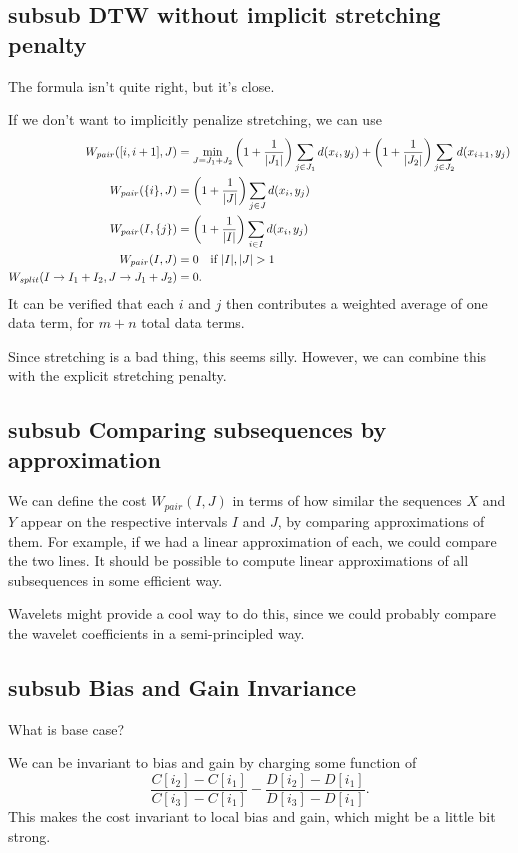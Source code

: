 \subsection{subsub DTW without implicit stretching penalty}
The formula isn't quite right, but it's close.

If we don't want to implicitly penalize stretching, we can use
\begin{align*}
W_{pair}([i,i+1], J) &= \min_{J = J_1 + J_2} \left(1+ \frac{1}{|J_1|}\right) \sum_{j\in J_1} d(x_i,
y_j) + \left(1+ \frac{1}{|J_2|}\right) \sum_{j\in J_2} d(x_{i+1}, y_j)\\
W_{pair}(\{i\}, J) &= \left(1 + \frac{1}{|J|}\right) \sum_{j\in J} d(x_i, y_j) \\
W_{pair}(I, \{j\}) &= \left(1 + \frac{1}{|I|}\right) \sum_{i\in I} d(x_i, y_j) \\
W_{pair}(I, J) &= 0 \mbox{\quad if } |I|,|J| > 1 \\
W_{split}(I\to I_1 + I_2, J\to J_1 + J_2) &= 0.
\end{align*}
It can be verified that each $i$ and $j$ then contributes a weighted
average of one data term, for $m+n$ total data terms.

Since stretching is a bad thing, this seems silly. However, we can
combine this with the explicit stretching penalty.

\subsection{subsub Comparing subsequences by approximation}

We can define the cost $W_{pair}(I,J)$ in terms of how similar the
sequences $X$ and $Y$ appear on the respective intervals $I$ and $J$,
by comparing approximations of them. For example, if we had a linear
approximation of each, we could compare the two lines. It should be
possible to compute linear approximations of all subsequences in some
efficient way.

Wavelets might provide a cool way to do this, since we could probably
compare the wavelet coefficients in a semi-principled way.

\subsection{subsub Bias and Gain Invariance}

What is base case?

We can be invariant to bias and gain by charging some function of
$$\frac{C[i_2] - C[i_1]}{C[i_3] - C[i_1]} - \frac{D[i_2] - D[i_1]}{D[i_3] - D[i_1]}.$$
This makes the cost invariant to local bias and gain, which might be a little bit strong.

